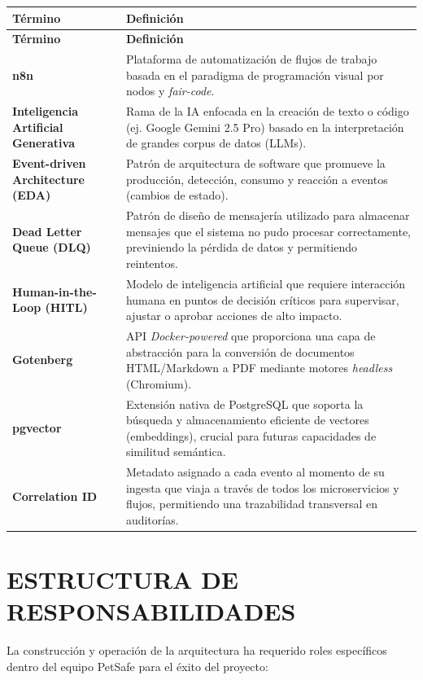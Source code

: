 \documentclass{encabezado}
\begin{document}
\begin{longtable}{P{4.5cm} P{10.5cm}}
\toprule
\textbf{Término} & \textbf{Definición} \\
\midrule
\endfirsthead
\midrule
\textbf{Término} & \textbf{Definición} \\
\midrule
\endhead
\textbf{n8n} & Plataforma de automatización de flujos de trabajo basada en el paradigma de programación visual por nodos y \textit{fair-code}. \\
\addlinespace
\textbf{Inteligencia Artificial Generativa} & Rama de la IA enfocada en la creación de texto o código (ej. Google Gemini 2.5 Pro) basado en la interpretación de grandes corpus de datos (LLMs). \\
\addlinespace
\textbf{Event-driven Architecture (EDA)} & Patrón de arquitectura de software que promueve la producción, detección, consumo y reacción a eventos (cambios de estado). \\
\addlinespace
\textbf{Dead Letter Queue (DLQ)} & Patrón de diseño de mensajería utilizado para almacenar mensajes que el sistema no pudo procesar correctamente, previniendo la pérdida de datos y permitiendo reintentos. \\
\addlinespace
\textbf{Human-in-the-Loop (HITL)} & Modelo de inteligencia artificial que requiere interacción humana en puntos de decisión críticos para supervisar, ajustar o aprobar acciones de alto impacto. \\
\addlinespace
\textbf{Gotenberg} & API \textit{Docker-powered} que proporciona una capa de abstracción para la conversión de documentos HTML/Markdown a PDF mediante motores \textit{headless} (Chromium). \\
\addlinespace
\textbf{pgvector} & Extensión nativa de PostgreSQL que soporta la búsqueda y almacenamiento eficiente de vectores (embeddings), crucial para futuras capacidades de similitud semántica. \\
\addlinespace
\textbf{Correlation ID} & Metadato asignado a cada evento al momento de su ingesta que viaja a través de todos los microservicios y flujos, permitiendo una trazabilidad transversal en auditorías. \\
\bottomrule
\end{longtable}

\section{ESTRUCTURA DE RESPONSABILIDADES}

La construcción y operación de la arquitectura ha requerido roles específicos dentro del equipo PetSafe para el éxito del proyecto:
\end{document}
